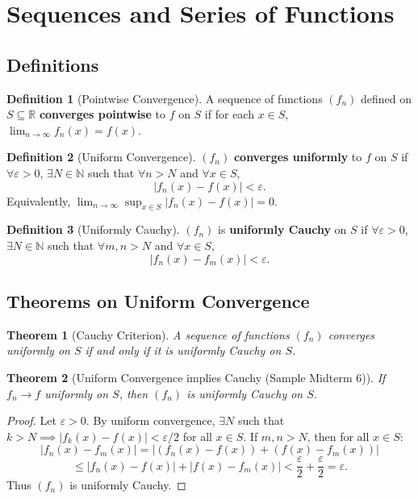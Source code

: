 \documentclass{article}
\theoremstyle{definition}
\newtheorem{definition}{Definition}[section]
\theoremstyle{plain}
\newtheorem{theorem}{Theorem}[section]
\theoremstyle{remark}
\newcommand{\R}{\mathbb{R}}
\newcommand{\N}{\mathbb{N}}
\newcommand{\eps}{\varepsilon}
\begin{document}
\section{Sequences and Series of Functions}

\subsection{Definitions}

\begin{definition}[Pointwise Convergence{\cite[Def 24.1]{Ross}}]
A sequence of functions \((f_n)\) defined on \(S \subseteq \R\) \textbf{converges pointwise} to \(f\) on \(S\) if for each \(x \in S\), \(\lim_{n\to\infty} f_n(x) = f(x)\).
\end{definition}

\begin{definition}[Uniform Convergence{\cite[Def 24.2]{Ross}}]
\((f_n)\) \textbf{converges uniformly} to \(f\) on \(S\) if \(\forall \eps > 0\), \(\exists N \in \N\) such that \(\forall n > N\) and \(\forall x \in S\),
\[ |f_n(x) - f(x)| < \eps. \]
Equivalently, \(\lim_{n\to\infty} \sup_{x \in S} |f_n(x) - f(x)| = 0\).
\end{definition}

\begin{definition}[Uniformly Cauchy{\cite[Def 25.3]{Ross}}]
\((f_n)\) is \textbf{uniformly Cauchy} on \(S\) if \(\forall \eps > 0\), \(\exists N \in \N\) such that \(\forall m, n > N\) and \(\forall x \in S\),
\[ |f_n(x) - f_m(x)| < \eps. \]
\end{definition}

\subsection{Theorems on Uniform Convergence}

\begin{theorem}[Cauchy Criterion{\cite[Thm 25.4]{Ross}}]
A sequence of functions \((f_n)\) converges uniformly on \(S\) if and only if it is uniformly Cauchy on \(S\).
\end{theorem}

\begin{theorem}[Uniform Convergence implies Cauchy (Sample Midterm 6)]
If \(f_n \to f\) uniformly on \(S\), then \((f_n)\) is uniformly Cauchy on \(S\).
\end{theorem}
\begin{proof}
Let \(\eps > 0\). By uniform convergence, \(\exists N\) such that \(k > N \implies |f_k(x) - f(x)| < \eps/2\) for all \(x \in S\).
If \(m, n > N\), then for all \(x \in S\):
\[ |f_n(x) - f_m(x)| = |(f_n(x) - f(x)) + (f(x) - f_m(x))| \]
\[ \le |f_n(x) - f(x)| + |f(x) - f_m(x)| < \frac{\eps}{2} + \frac{\eps}{2} = \eps. \]
Thus \((f_n)\) is uniformly Cauchy.
\end{proof}
\end{document}
